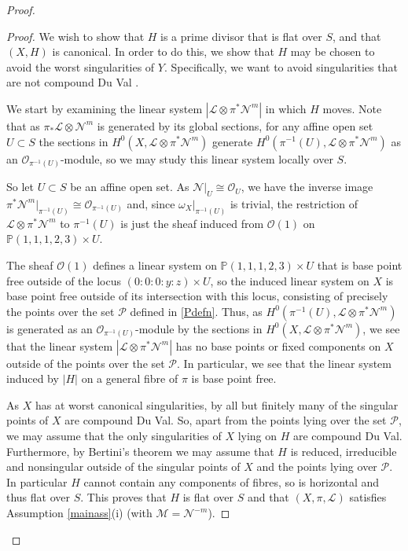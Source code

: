 \documentclass{amsart}
\begin{document}
\begin{proof}
\begin{proof}
We wish to show that $H$ is a prime divisor that is flat over $S$, and that $(X,H)$ is canonical. In order to do this, we show that $H$ may be chosen to avoid the worst singularities of $Y$. Specifically, we want to avoid singularities that are not compound Du Val \cite[Definition 5.32]{bgav}.

We start by examining the linear system $|{\mathcal{L}} \otimes \pi^* {\mathcal{N}}^m|$ in which $H$ moves. Note that as $\pi_*{\mathcal{L}} \otimes {\mathcal{N}}^m$ is generated by its global sections, for any affine open set $U \subset S$ the sections in $H^0(X, {\mathcal{L}} \otimes \pi^* {\mathcal{N}}^m)$ generate $H^0(\pi^{-1}(U), {\mathcal{L}} \otimes \pi^* {\mathcal{N}}^m)$ as an ${\mathcal{O}}_{\pi^{-1}(U)}$-module, so we may study this linear system locally over $S$.

So let $U \subset S$ be an affine open set. As ${\mathcal{N}}|_U \cong {\mathcal{O}}_U$, we have the inverse image $\pi^* {\mathcal{N}}^m|_{\pi^{-1}(U)} \cong {\mathcal{O}}_{\pi^{-1}(U)}$ and, since $\omega_X|_{\pi^{-1}(U)}$ is trivial, the restriction of ${\mathcal{L}} \otimes \pi^* {\mathcal{N}}^m$ to $\pi^{-1}(U)$ is just the sheaf induced from ${\mathcal{O}}(1)$ on ${\mathbb{P}}(1,1,1,2,3) \times U$. 

The sheaf ${\mathcal{O}}(1)$ defines a linear system on ${\mathbb{P}}(1,1,1,2,3) \times U$ that is base point free outside of the locus $(0\!:\!0\!:\!0\!:\!y\!:\!z) \times U$, so the induced linear system on $X$ is base point free outside of its intersection with this locus, consisting of precisely the points over the set ${\mathcal{P}}$ defined in \ref{Pdefn}. Thus, as $H^0(\pi^{-1}(U), {\mathcal{L}} \otimes \pi^* {\mathcal{N}}^m)$ is generated as an ${\mathcal{O}}_{\pi^{-1}(U)}$-module by the sections in $H^0(X, {\mathcal{L}} \otimes \pi^* {\mathcal{N}}^m)$, we see that the linear system $|{\mathcal{L}} \otimes \pi^* {\mathcal{N}}^m|$ has no base points or fixed components on $X$ outside of the points over the set ${\mathcal{P}}$. In particular, we see that the linear system induced by $|H|$ on a general fibre of $\pi$ is base point free.

As $X$ has at worst canonical singularities, by \cite[Corollary 5.40]{bgav} all but finitely many of the singular points of $X$ are compound Du Val. So, apart from the points lying over the set ${\mathcal{P}}$, we may assume that the only singularities of $X$ lying on $H$ are compound Du Val. Furthermore, by Bertini's theorem we may assume that $H$ is reduced, irreducible and nonsingular outside of the singular points of $X$ and the points lying over ${\mathcal{P}}$. In particular $H$ cannot contain any components of fibres, so is horizontal and thus flat over $S$. This proves that $H$ is flat over $S$ and that $(X,\pi,{\mathcal{L}})$ satisfies Assumption \ref{mainass}(i) (with ${\mathcal{M}} = {\mathcal{N}}^{-m}$).


\end{proof}
\end{proof}
\end{document}

